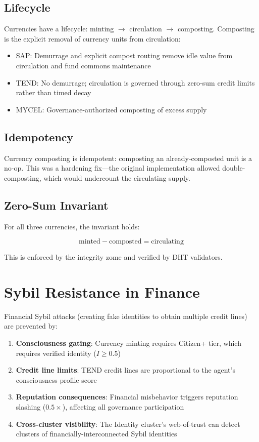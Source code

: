 \documentclass[11pt,twocolumn]{article}
\begin{document}
\subsection{Lifecycle}

Currencies have a lifecycle: minting $\to$ circulation $\to$ composting.
Composting is the explicit removal of currency units from circulation:

\begin{itemize}[nosep]
  \item SAP: Demurrage and explicit compost routing remove idle value from
    circulation and fund commons maintenance
  \item TEND: No demurrage; circulation is governed through zero-sum credit
    limits rather than timed decay
  \item MYCEL: Governance-authorized composting of excess supply
\end{itemize}

\subsection{Idempotency}

Currency composting is idempotent: composting an already-composted unit is
a no-op. This was a hardening fix---the original implementation allowed
double-composting, which would undercount the circulating supply.

\subsection{Zero-Sum Invariant}

For all three currencies, the invariant holds:

\begin{equation}
  \text{minted} - \text{composted} = \text{circulating}
\end{equation}

This is enforced by the integrity zome and verified by DHT validators.

\section{Sybil Resistance in Finance}

Financial Sybil attacks (creating fake identities to obtain multiple credit
lines) are prevented by:

\begin{enumerate}[nosep]
  \item \textbf{Consciousness gating}: Currency minting requires Citizen+
    tier, which requires verified identity ($I \geq 0.5$)
  \item \textbf{Credit line limits}: TEND credit lines are proportional to
    the agent's consciousness profile score
  \item \textbf{Reputation consequences}: Financial misbehavior triggers
    reputation slashing ($0.5\times$), affecting all governance participation
  \item \textbf{Cross-cluster visibility}: The Identity cluster's web-of-trust
    can detect clusters of financially-interconnected Sybil identities
\end{enumerate}
\end{document}
